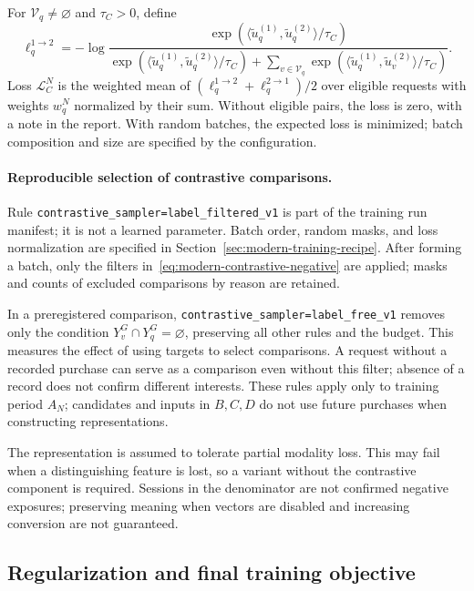 \documentclass[12pt,a4paper]{article}
\newcommand{\code}[1]{{\ttfamily\small\nolinkurl{#1}}}
\theoremstyle{plainru}
\begin{document}
For $\mathcal V_q\ne\varnothing$ and $\tau_C>0$, define
\begin{equation}\label{eq:modern-contrastive-loss}
\ell_q^{1\to2}=-\log
\frac{\exp(\langle\tilde u_q^{(1)},\tilde u_q^{(2)}\rangle/\tau_C)}
{\exp(\langle\tilde u_q^{(1)},\tilde u_q^{(2)}\rangle/\tau_C)
+\sum_{v\in\mathcal V_q}
\exp(\langle\tilde u_q^{(1)},\tilde u_v^{(2)}\rangle/\tau_C)}.
\end{equation}
Loss $\mathcal L_C^N$ is the weighted mean of
$(\ell_q^{1\to2}+\ell_q^{2\to1})/2$ over eligible requests
with weights $w_q^N$ normalized by their sum.
Without eligible pairs, the loss is zero, with a note in the report.
With random batches, the expected loss is minimized;
batch composition and size are specified by the configuration.

\paragraph{Reproducible selection of contrastive comparisons.}
Rule \code{contrastive_sampler=label_filtered_v1} is part of the training
run manifest; it is not a learned parameter. Batch order,
random masks, and loss normalization are specified in
Section~\ref{sec:modern-training-recipe}. After forming a batch,
only the filters in~\eqref{eq:modern-contrastive-negative} are applied;
masks and counts of excluded comparisons by reason are retained.

In a preregistered comparison,
\code{contrastive_sampler=label_free_v1} removes only the condition
$Y_v^G\cap Y_q^G=\varnothing$, preserving all other rules and the budget.
This measures the effect of using targets to select comparisons.
A request without a recorded purchase can serve as a comparison even without this
filter; absence of a record does not confirm different interests. These rules
apply only to training period $A_N$; candidates and inputs
in $B,C,D$ do not use future purchases when constructing representations.

The representation is assumed to tolerate partial modality loss.
This may fail when a distinguishing feature is lost, so a variant
without the contrastive component is required. Sessions in the denominator are not
confirmed negative exposures; preserving meaning when vectors are disabled
and increasing conversion are not guaranteed.

\subsection{Regularization and final training objective}
\label{sec:modern-training}
\end{document}
